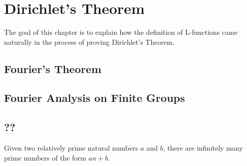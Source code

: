\chapter{Dirichlet's Theorem}

The goal of this chapter is to explain how the definition of L-functions came naturally in the process of proving Dirichlet's Theorem.

\section{Fourier's Theorem}

\section{Fourier Analysis on Finite Groups}

\section{??}

\begin{theorem}
    Given two relatively prime natural numbers $a$ and $b$, there are infinitely many prime numbers of the form $an+b$.
\end{theorem}